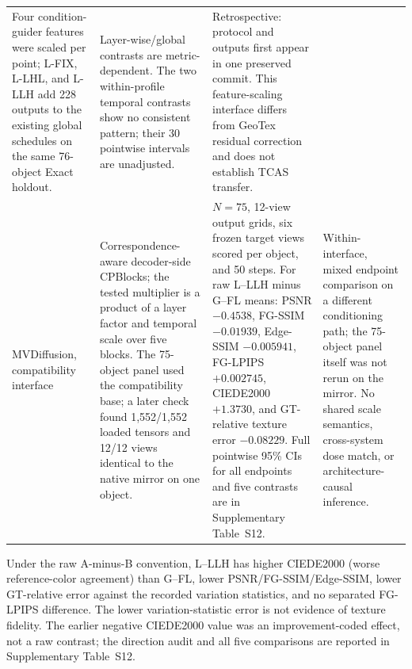 \documentclass[times,twocolumn,final]{elsarticle}
\begin{document}
\begin{table}[t]
\begin{tabular}{p{2.4cm}p{4.0cm}p{4.2cm}p{4.5cm}}
Four condition-guider features were scaled per point; L-FIX, L-LHL, and L-LLH add 228 outputs to the existing global schedules on the same 76-object Exact holdout. &
Layer-wise/global contrasts are metric-dependent. The two within-profile temporal contrasts show no consistent pattern; their 30 pointwise intervals are unadjusted. &
Retrospective: protocol and outputs first appear in one preserved commit. This feature-scaling interface differs from GeoTex residual correction and does not establish TCAS transfer. \\
MVDiffusion, compatibility interface &
Correspondence-aware decoder-side CPBlocks; the tested multiplier is a product of a layer factor and temporal scale over five blocks. The 75-object panel used the compatibility base; a later check found 1,552/1,552 loaded tensors and 12/12 views identical to the native mirror on one object. &
$N=75$, 12-view output grids, six frozen target views scored per object, and 50 steps. For raw L--LLH minus G--FL means: PSNR $-0.4538$, FG-SSIM $-0.01939$, Edge-SSIM $-0.005941$, FG-LPIPS $+0.002745$, CIEDE2000 $+1.3730$, and GT-relative texture error $-0.08229$. Full pointwise 95\% CIs for all endpoints and five contrasts are in Supplementary Table~S12. &
Within-interface, mixed endpoint comparison on a different conditioning path; the 75-object panel itself was not rerun on the mirror. No shared scale semantics, cross-system dose match, or architecture-causal inference. \\
\bottomrule
\end{tabular}
\end{table}

Under the raw A-minus-B convention, L--LLH has higher CIEDE2000 (worse reference-color agreement) than G--FL, lower PSNR/FG-SSIM/Edge-SSIM, lower GT-relative error against the recorded variation statistics, and no separated FG-LPIPS difference. The lower variation-statistic error is not evidence of texture fidelity. The earlier negative CIEDE2000 value was an improvement-coded effect, not a raw contrast; the direction audit and all five comparisons are reported in Supplementary Table~S12.
\end{document}
